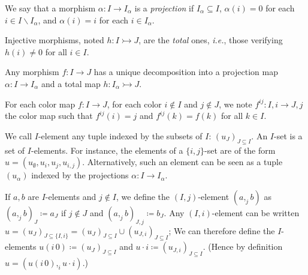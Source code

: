 \documentclass[english]{PaperTools/latex/lipics}
\def\ie{\textit{i.e.}}
\begin{document}
 \begin{definition}[Projection]
    We say that a morphism $α : I → I_α$ is a \emph{projection} if
    $I_α ⊆ I$,
    $α(i) = 0$ for each $i ∈ I \backslash I_α$, and
    $α(i) = i$ for each $i ∈ I_α$.
  \end{definition}
  \begin{definition}
  Injective morphisms, noted $h : I ↣ J$, are the \emph{total} ones, \ie,
  those verifying $h(i) ≠ 0$ for all $i ∈ I$.
  \end{definition}
  \begin{remark}
  Any morphism $f : I → J$ has a
  unique decomposition into a projection map
  $α : I → I_α$ and a total map $h : I_α ↣ J$.
  \end{remark}

\begin{definition}[$f^{ij}$]
  For each color map $f : I → J$, for each color $i ∉ I$ and $j ∉ J$,
  we note $f^{ij} : I,i → J,j$ the color map such that $f^{ij}(i) = j$
  and $f^{ij}(k) = f(k)$ for all $k ∈ I$.
\end{definition}

\begin{definition}[$I$-set]
  We call $I$-element any tuple indexed by the subsets of $I$: $(u_J)_{J ⊆ I}$.
  An $I$-set is a set of $I$-elements.  For instance, the elements of a
  $\{i,j\}$-set are of the form $u = (u_∅,u_i,u_j,u_{i,j})$.
  Alternatively, such an element can be seen as a tuple $(u_α)$ indexed
  by the projections $α : I → I_α$.
\end{definition}
  If $a,b$ are $I$-elements and $j ∉ I$, we define the $(I,j)$-element
  $(a ,_j b)$ as $(a ,_j b)_J ≔ a_J$ if $j ∉ J$ and $(a ,_j b)_{J,j} ≔ b_J$.
  Any $(I,i)$-element can be written $u = (u_J)_{J ⊆ \{I,i\}} = (u_J)_{J ⊆ I} ∪ (u_{J,i})_{J ⊆ I}$;
  We can therefore define the $I$-elements $u (i\,0) ≔ (u_J)_{J ⊆ I}$ and $u · i ≔ (u_{J,i})_{J ⊆ I}$.
  (Hence by definition $u = (u (i\,0) ,_i u · i)$.)
\end{document}
